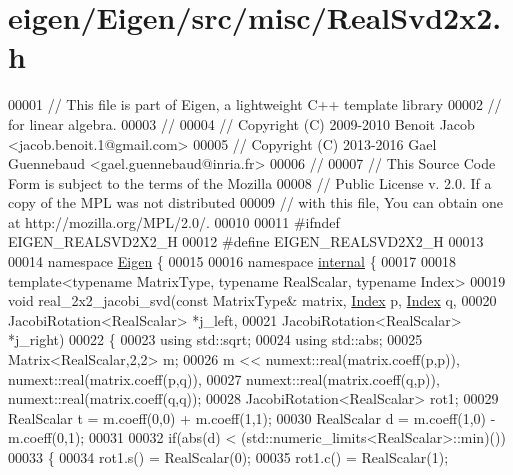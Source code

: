 \hypertarget{eigen_2_eigen_2src_2misc_2_real_svd2x2_8h_source}{}\section{eigen/\+Eigen/src/misc/\+Real\+Svd2x2.h}
\label{eigen_2_eigen_2src_2misc_2_real_svd2x2_8h_source}

\begin{DoxyCode}
00001 \textcolor{comment}{// This file is part of Eigen, a lightweight C++ template library}
00002 \textcolor{comment}{// for linear algebra.}
00003 \textcolor{comment}{//}
00004 \textcolor{comment}{// Copyright (C) 2009-2010 Benoit Jacob <jacob.benoit.1@gmail.com>}
00005 \textcolor{comment}{// Copyright (C) 2013-2016 Gael Guennebaud <gael.guennebaud@inria.fr>}
00006 \textcolor{comment}{//}
00007 \textcolor{comment}{// This Source Code Form is subject to the terms of the Mozilla}
00008 \textcolor{comment}{// Public License v. 2.0. If a copy of the MPL was not distributed}
00009 \textcolor{comment}{// with this file, You can obtain one at http://mozilla.org/MPL/2.0/.}
00010 
00011 \textcolor{preprocessor}{#ifndef EIGEN\_REALSVD2X2\_H}
00012 \textcolor{preprocessor}{#define EIGEN\_REALSVD2X2\_H}
00013 
00014 \textcolor{keyword}{namespace }\hyperlink{namespace_eigen}{Eigen} \{
00015 
00016 \textcolor{keyword}{namespace }\hyperlink{namespaceinternal}{internal} \{
00017 
00018 \textcolor{keyword}{template}<\textcolor{keyword}{typename} MatrixType, \textcolor{keyword}{typename} RealScalar, \textcolor{keyword}{typename} Index>
00019 \textcolor{keywordtype}{void} real\_2x2\_jacobi\_svd(\textcolor{keyword}{const} MatrixType& matrix, \hyperlink{namespace_eigen_a62e77e0933482dafde8fe197d9a2cfde}{Index} p, \hyperlink{namespace_eigen_a62e77e0933482dafde8fe197d9a2cfde}{Index} q,
00020                          JacobiRotation<RealScalar> *j\_left,
00021                          JacobiRotation<RealScalar> *j\_right)
00022 \{
00023   \textcolor{keyword}{using} std::sqrt;
00024   \textcolor{keyword}{using} std::abs;
00025   Matrix<RealScalar,2,2> m;
00026   m << numext::real(matrix.coeff(p,p)), numext::real(matrix.coeff(p,q)),
00027        numext::real(matrix.coeff(q,p)), numext::real(matrix.coeff(q,q));
00028   JacobiRotation<RealScalar> rot1;
00029   RealScalar t = m.coeff(0,0) + m.coeff(1,1);
00030   RealScalar d = m.coeff(1,0) - m.coeff(0,1);
00031 
00032   \textcolor{keywordflow}{if}(abs(d) < (std::numeric\_limits<RealScalar>::min)())
00033   \{
00034     rot1.s() = RealScalar(0);
00035     rot1.c() = RealScalar(1);

\end{DoxyCode}
